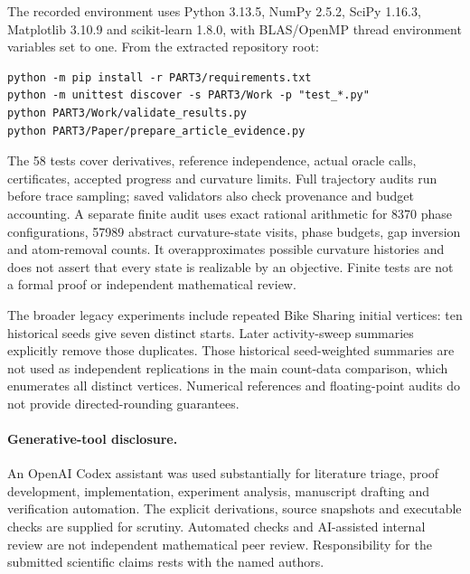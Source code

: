 The recorded environment uses Python 3.13.5, NumPy 2.5.2, SciPy 1.16.3,
Matplotlib 3.10.9 and scikit-learn 1.8.0, with BLAS/OpenMP thread
environment variables set to one. From the extracted repository root:
\begin{verbatim}
python -m pip install -r PART3/requirements.txt
python -m unittest discover -s PART3/Work -p "test_*.py"
python PART3/Work/validate_results.py
python PART3/Paper/prepare_article_evidence.py
\end{verbatim}
The 58 tests cover derivatives, reference independence, actual oracle
calls, certificates, accepted progress and curvature limits. Full
trajectory audits run before trace sampling; saved validators also
check provenance and budget accounting.
A separate finite audit uses exact rational arithmetic for 8370
phase configurations, 57989 abstract curvature-state visits, phase
budgets, gap inversion and atom-removal counts. It overapproximates
possible curvature histories and does not assert that every state
is realizable by an objective. Finite tests are not a formal proof
or independent mathematical review.

The broader legacy experiments include repeated Bike Sharing initial
vertices: ten historical seeds give seven distinct starts. Later
activity-sweep summaries explicitly remove those duplicates. Those
historical seed-weighted summaries are not used as independent
replications in the main count-data comparison, which enumerates all
distinct vertices. Numerical references and floating-point audits
do not provide directed-rounding guarantees.

\paragraph{Generative-tool disclosure.}
An OpenAI Codex assistant was used substantially for literature triage,
proof development, implementation, experiment analysis, manuscript
drafting and verification automation. The explicit derivations, source
snapshots and executable checks are supplied for scrutiny. Automated
checks and AI-assisted internal review are not independent mathematical
peer review. Responsibility for the submitted scientific claims rests
with the named authors.
